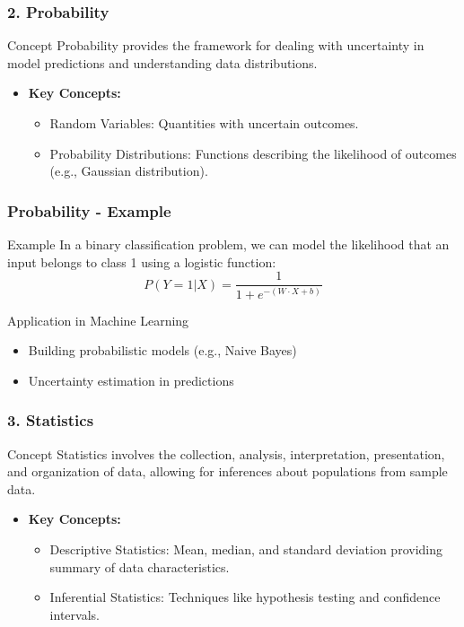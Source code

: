 \documentclass[aspectratio=169]{beamer}
\begin{document}
\begin{frame}[fragile]
    \frametitle{2. Probability}
    \begin{block}{Concept}
        Probability provides the framework for dealing with uncertainty in model predictions and understanding data distributions.
    \end{block}
    \begin{itemize}
        \item \textbf{Key Concepts:}
        \begin{itemize}
            \item Random Variables: Quantities with uncertain outcomes.
            \item Probability Distributions: Functions describing the likelihood of outcomes (e.g., Gaussian distribution).
        \end{itemize}
    \end{itemize}
\end{frame}

\begin{frame}[fragile]
    \frametitle{Probability - Example}
    \begin{block}{Example}
        In a binary classification problem, we can model the likelihood that an input belongs to class 1 using a logistic function:
        \begin{equation}
            P(Y=1|X) = \frac{1}{1 + e^{-(W \cdot X + b)}}
        \end{equation}
    \end{block}
    \begin{block}{Application in Machine Learning}
        \begin{itemize}
            \item Building probabilistic models (e.g., Naive Bayes)
            \item Uncertainty estimation in predictions
        \end{itemize}
    \end{block}
\end{frame}

\begin{frame}[fragile]
    \frametitle{3. Statistics}
    \begin{block}{Concept}
        Statistics involves the collection, analysis, interpretation, presentation, and organization of data, allowing for inferences about populations from sample data.
    \end{block}
    \begin{itemize}
        \item \textbf{Key Concepts:}
        \begin{itemize}
            \item Descriptive Statistics: Mean, median, and standard deviation providing summary of data characteristics.
            \item Inferential Statistics: Techniques like hypothesis testing and confidence intervals.
        \end{itemize}
    \end{itemize}
\end{frame}
\end{document}
